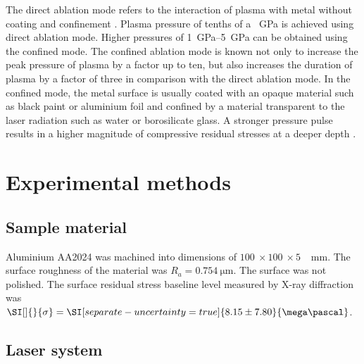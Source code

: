 \documentclass[sn-nature]{sn-jnl}%
\theoremstyle{thmstyleone}%
\theoremstyle{thmstyletwo}%
\theoremstyle{thmstylethree}%
\begin{document}
The direct ablation mode refers to the interaction of plasma with metal without coating and confinement \cite{Ding2006}. Plasma pressure of tenths of a \SI{}{\GPa} is achieved using direct ablation mode. Higher pressures of \SIrange{1}{5}{\GPa} can be obtained using the confined mode. The confined ablation mode is known not only to increase the peak pressure of plasma by a factor up to ten, but also increases the duration of plasma by a factor of three in comparison with the direct ablation mode. In the confined mode, the metal surface is usually coated with an opaque material such as black paint or aluminium foil and confined by a material transparent to the laser radiation such as water or borosilicate glass. A stronger pressure pulse results in a higher magnitude of compressive residual stresses at a deeper depth \cite{Fairand19741015}. 




\section{Experimental methods}\label{sec:methods}


    \subsection{Sample material}
    Aluminium AA2024 was machined into dimensions of \(\SI[]{100}{} \times \SI[]{100}{} \times \SI[]{5}{}\) \SI[]{}{\mm}. The surface roughness of the material was \( R_a  = \SI[]{0.754}{\micro\metre} \). The surface was not polished.  The surface residual stress baseline level measured by X-ray diffraction was  \( \SI[]{}{\sigma}  = \SI[separate-uncertainty = true]{8.15 \pm 7.80 }{\mega\pascal} \).


    \subsection{Laser system}
\end{document}
